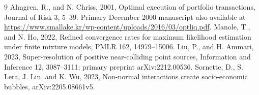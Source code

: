 \documentclass[11pt]{article}
\begin{document}
\begin{thebibliography}{9}
Almgren, R., and N. Chriss, 2001, Optimal execution of portfolio transactions, Journal of Risk 3, 5--39. Primary December 2000 manuscript also available at \url{https://www.smallake.kr/wp-content/uploads/2016/03/optliq.pdf}.
Manole, T., and N. Ho, 2022, Refined convergence rates for maximum likelihood estimation under finite mixture models, PMLR 162, 14979--15006.
Liu, P., and H. Ammari, 2023, Super-resolution of positive near-colliding point sources, Information and Inference 12, 3087--3111; primary preprint arXiv:2212.00536.
Sornette, D., S. Lera, J. Lin, and K. Wu, 2023, Non-normal interactions create socio-economic bubbles, arXiv:2205.08661v5.
\end{thebibliography}
\end{document}
